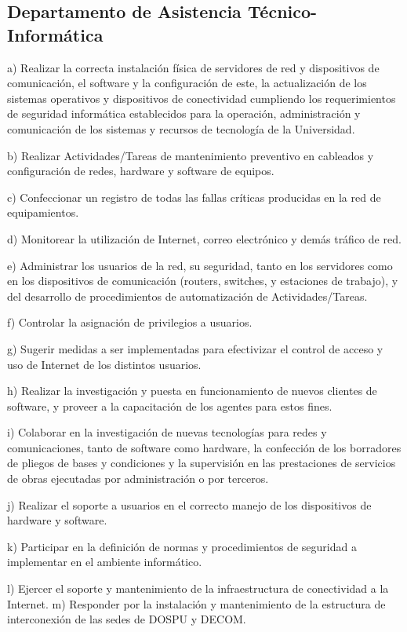 \subsection{Departamento de Asistencia Técnico-Informática}
\begin{displayquote}
a) Realizar la correcta instalación física de servidores de red y dispositivos de comunicación, el software y la configuración de este, la actualización de los sistemas operativos y dispositivos de conectividad cumpliendo los requerimientos de seguridad informática establecidos para la operación, administración y comunicación de los sistemas y recursos de tecnología de la Universidad.

b) Realizar Actividades/Tareas de mantenimiento preventivo en cableados y configuración de redes, hardware y software de equipos.

c) Confeccionar un registro de todas las fallas críticas producidas en la red de equipamientos.

d) Monitorear la utilización de Internet, correo electrónico y demás tráfico de red.

e) Administrar los usuarios de la red, su seguridad, tanto en los servidores como en los dispositivos de comunicación (routers, switches, y estaciones de trabajo), y del desarrollo de procedimientos de automatización de Actividades/Tareas.

f) Controlar la asignación de privilegios a usuarios.

g) Sugerir medidas a ser implementadas para efectivizar el control de acceso y uso de Internet de los distintos usuarios.

h) Realizar la investigación y puesta en funcionamiento de nuevos clientes de software, y proveer a la capacitación de los agentes para estos fines.

i) Colaborar en la investigación de nuevas tecnologías para redes y comunicaciones, tanto de software como hardware, la confección de los borradores de pliegos de bases y condiciones y la supervisión en las prestaciones de servicios de obras ejecutadas por administración o por terceros.

j) Realizar el soporte a usuarios en el correcto manejo de los dispositivos de hardware y software.

k) Participar en la definición de normas y procedimientos de seguridad a implementar en el ambiente informático.

l) Ejercer el soporte y mantenimiento de la infraestructura de conectividad a la Internet. m) Responder por la instalación y mantenimiento de la estructura de interconexión de las sedes de DOSPU y DECOM.


\end{displayquote}
